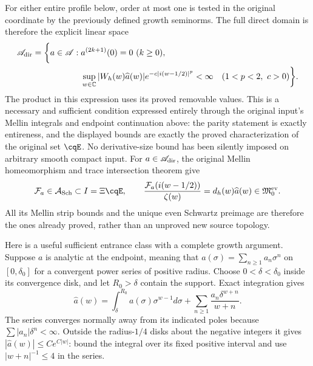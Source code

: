 For either entire profile below, order at most one is tested in the
original coordinate by the previously defined growth seminorms.
The full direct domain is therefore the explicit linear space
\begin{equation}
\begin{split}
 \mathscr A_{\rm dir}
 =\biggl\{a\in\mathscr A:\;&a^{(2k+1)}(0)=0\ (k\geq0),\\
 &\sup_{w\in\mathbb C}|W_h(w)\widehat a(w)|
       e^{-c|i(w-1/2)|^p}<\infty
       \quad(1<p<2,\ c>0)\biggr\}.
\end{split}
 \label{eq:cq-angular-direct-order-domain}
\end{equation}
The product in this expression uses its proved removable values.
This is a necessary and sufficient condition expressed entirely
through the original input's Mellin integrals and endpoint
continuation above: the parity statement is exactly entireness,
and the displayed bounds are exactly the proved characterization
of the original set $\cqE$. No derivative-size bound has been
silently imposed on arbitrary smooth compact input.
For $a\in\mathscr A_{\rm dir}$, the original Mellin homeomorphism
and trace intersection theorem give
\begin{equation}
 \mathcal F_a\in\mathcal A_{\rm Sch}\subset I=\Xi\cqE,\qquad
 \frac{\mathcal F_a(i(w-1/2))}{\zeta(w)}
       =d_h(w)\widehat a(w)
       \in\mathfrak M_0^{\rm ev}.
 \label{eq:cq-angular-direct-trace-intersection}
\end{equation}
All its Mellin strip bounds and the unique even Schwartz preimage
are therefore the ones already proved, rather than an unproved
new source topology.

Here is a useful sufficient entrance class with a complete growth
argument. Suppose $a$ is analytic at the endpoint, meaning that
$a(\sigma)=\sum_{n\geq1}a_n\sigma^n$ on $[0,\delta_0]$ for a
convergent power series of positive radius. Choose
$0<\delta<\delta_0$ inside its convergence disk, and let
$R_0>\delta$ contain the support. Exact integration gives
\begin{equation}
 \widehat a(w)=
  \int_\delta^{R_0}a(\sigma)\sigma^{w-1}d\sigma
       +\sum_{n\geq1}\frac{a_n\delta^{w+n}}{w+n}.
 \label{eq:cq-angular-analytic-endpoint-Mellin}
\end{equation}
The series converges normally away from its indicated poles because
$\sum|a_n|\delta^n<\infty$. Outside the radius-$1/4$ disks about
the negative integers it gives
$|\widehat a(w)|\leq C e^{C|w|}$: bound the integral over its
fixed positive interval and use $|w+n|^{-1}\leq4$ in the series.

